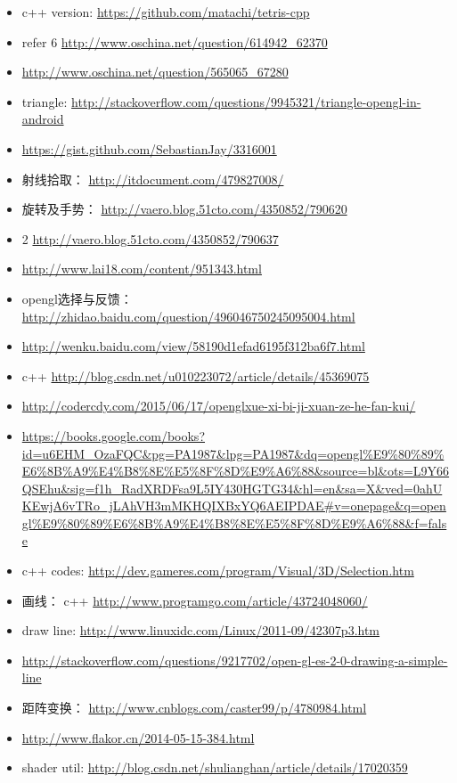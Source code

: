 \documentclass[9pt,b5paper]{article}
\begin{document}
\begin{itemize}
\item c++ version: \url{https://github.com/matachi/tetris-cpp}
\item refer 6 \url{http://www.oschina.net/question/614942_62370}
\item \url{http://www.oschina.net/question/565065_67280}
\item triangle: \url{http://stackoverflow.com/questions/9945321/triangle-opengl-in-android}
\item \url{https://gist.github.com/SebastianJay/3316001}
\item 射线拾取： \url{http://itdocument.com/479827008/}
\item 旋转及手势： \url{http://vaero.blog.51cto.com/4350852/790620}
\item 2 \url{http://vaero.blog.51cto.com/4350852/790637}
\item \url{http://www.lai18.com/content/951343.html}
\item opengl选择与反馈： \url{http://zhidao.baidu.com/question/496046750245095004.html}
\item \url{http://wenku.baidu.com/view/58190d1efad6195f312ba6f7.html}
\item c++ \url{http://blog.csdn.net/u010223072/article/details/45369075}
\item \url{http://codercdy.com/2015/06/17/openglxue-xi-bi-ji-xuan-ze-he-fan-kui/}
\item \url{https://books.google.com/books?id=u6EHM_OzaFQC&pg=PA1987&lpg=PA1987&dq=opengl\%E9\%80\%89\%E6\%8B\%A9\%E4\%B8\%8E\%E5\%8F\%8D\%E9\%A6\%88&source=bl&ots=L9Y66QSEhu&sig=f1h_RadXRDFsa9L5IY430HGTG34&hl=en&sa=X&ved=0ahUKEwjA6vTRo_jLAhVH3mMKHQIXBxYQ6AEIPDAE#v=onepage&q=opengl\%E9\%80\%89\%E6\%8B\%A9\%E4\%B8\%8E\%E5\%8F\%8D\%E9\%A6\%88&f=false}
\item c++ codes: \url{http://dev.gameres.com/program/Visual/3D/Selection.htm}
\item 画线： c++ \url{http://www.programgo.com/article/43724048060/}
\item draw line: \url{http://www.linuxidc.com/Linux/2011-09/42307p3.htm}
\item \url{http://stackoverflow.com/questions/9217702/open-gl-es-2-0-drawing-a-simple-line}
\item 距阵变换： \url{http://www.cnblogs.com/caster99/p/4780984.html}
\item \url{http://www.flakor.cn/2014-05-15-384.html}
\item shader util: \url{http://blog.csdn.net/shulianghan/article/details/17020359}

\end{itemize}
\end{document}
